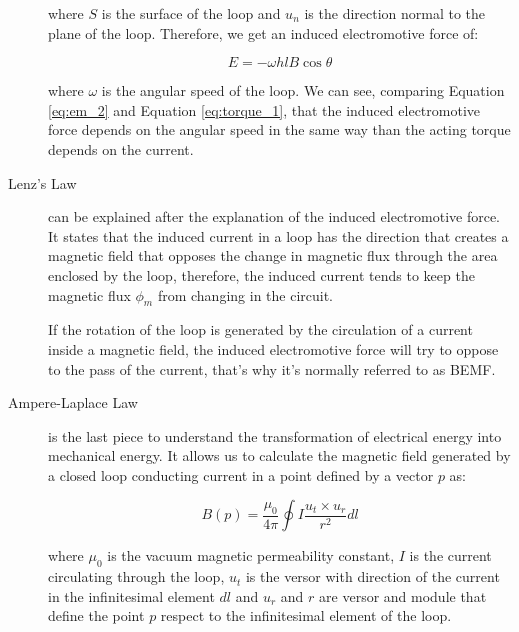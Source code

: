 \begin{description}
where $S$ is the surface of the loop and $u_{n}$ is the direction normal to the plane of the loop. Therefore, we get an induced electromotive force of:

\begin{equation}
	\label{eq:em_2}
	E = - \omega h l B \cos \theta
\end{equation}

where $\omega$ is the angular speed of the loop. We can see, comparing Equation \ref{eq:em_2} and Equation \ref{eq:torque_1}, that the induced electromotive force depends on the angular speed in the same way than the acting torque depends on the current.


\item[Lenz's Law] can be explained after the explanation of the induced electromotive force. It states that the induced current in a loop has the direction that creates a magnetic field that opposes the change in magnetic flux through the area enclosed by the loop, therefore, the induced current tends to keep the magnetic flux $\phi _{m}$ from changing in the circuit.

If the rotation of the loop is generated by the circulation of a current inside a magnetic field, the induced electromotive force will try to oppose to the pass of the current, that’s why it’s normally referred to as \acf{BEMF}.

 
\item[Ampere-Laplace Law] is the last piece to understand the transformation of electrical energy into mechanical energy. It allows us to calculate the magnetic field generated by a closed loop conducting current in a point defined by a vector $p$ as:

\begin{equation}
	\label{eq:B_1}
	B(p) = \frac{\mu_{0}}{4 \pi} \oint I \frac{u_{t} \times u_{r}}{r^{2}}dl
\end{equation}

where $\mu_{0}$ is the vacuum magnetic permeability constant, $I$ is the current circulating through the loop, $u_{t}$ is the versor with direction of the current in the infinitesimal element $dl$ and $u_{r}$ and $r$ are versor and module that define the point $p$ respect to the infinitesimal element of the loop.


\end{description}
